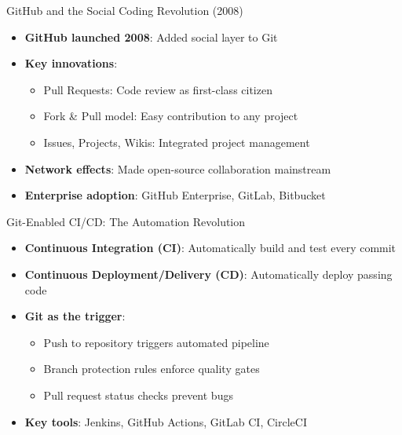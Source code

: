 \documentclass{beamer}
\begin{document}
\begin{frame}{GitHub and the Social Coding Revolution (2008)}
\begin{itemize}
    \item \textbf{GitHub launched 2008}: Added social layer to Git
    \item \textbf{Key innovations}:
        \begin{itemize}
            \item Pull Requests: Code review as first-class citizen
            \item Fork \& Pull model: Easy contribution to any project
            \item Issues, Projects, Wikis: Integrated project management
        \end{itemize}
    \item \textbf{Network effects}: Made open-source collaboration mainstream
    \item \textbf{Enterprise adoption}: GitHub Enterprise, GitLab, Bitbucket
\end{itemize}
\end{frame}

\begin{frame}{Git-Enabled CI/CD: The Automation Revolution}
\begin{itemize}
    \item \textbf{Continuous Integration (CI)}: Automatically build and test every commit
    \item \textbf{Continuous Deployment/Delivery (CD)}: Automatically deploy passing code
    \item \textbf{Git as the trigger}: 
        \begin{itemize}
            \item Push to repository triggers automated pipeline
            \item Branch protection rules enforce quality gates
            \item Pull request status checks prevent bugs
        \end{itemize}
    \item \textbf{Key tools}: Jenkins, GitHub Actions, GitLab CI, CircleCI
\end{itemize}

\end{frame}
\end{document}
